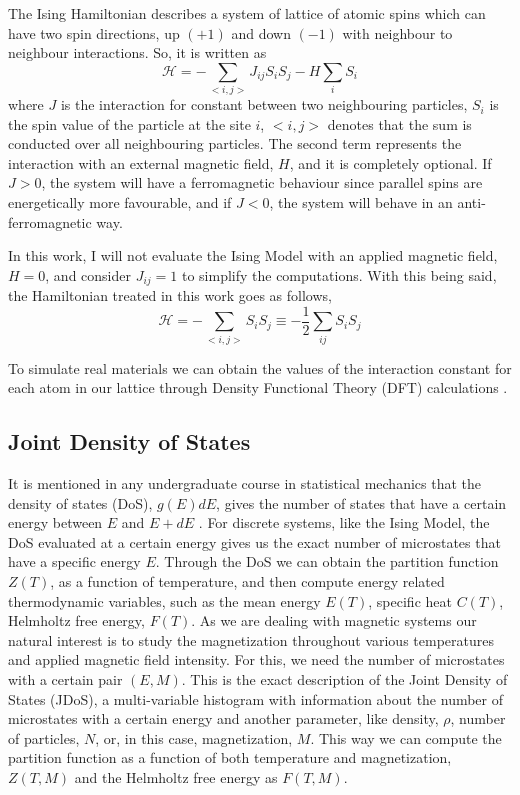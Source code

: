 The Ising Hamiltonian describes a system of lattice of atomic spins which can have two spin directions, up $(+1)$ and down $(-1)$ with neighbour to neighbour interactions. So, it is written as
\begin{equation}
	\mathcal{H} = -\sum_{<i,j>} J_{ij} S_i S_j - H \sum_iS_i
\end{equation}
where $J$ is the interaction for constant between two neighbouring particles, $S_i$ is the spin value of the particle at the site $i$, $<i,j>$ denotes that the sum is conducted over all neighbouring particles. The second term represents the interaction with an external magnetic field, $H$, and it is completely optional. If $J>0$, the system will have a ferromagnetic behaviour since parallel spins are energetically more favourable, and if $J<0$, the system will behave in an anti-ferromagnetic way.

In this work, I will not evaluate the Ising Model with an applied magnetic field, $H=0$, and consider $J_{ij}=1$ to simplify the computations. With this being said, the Hamiltonian treated in this work goes as follows,
\begin{equation}
	\mathcal{H} = -\sum_{<i,j>} S_i  S_j \equiv -\frac{1}{2} \sum_{ij} S_i S_j
\end{equation}

To simulate real materials we can obtain the values of the interaction constant for each atom in our lattice through Density Functional Theory (DFT) calculations \cite{DFT_book, Marzari2021}.

\subsection{Joint Density of States}

It is mentioned in any undergraduate course in statistical mechanics that the density of states (DoS), $g(E)dE$, gives the number of states that have a certain energy between $E$ and $E+dE$ \cite{stat_mech}. For discrete systems, like the Ising Model, the DoS evaluated at a certain energy gives us the exact number of microstates that have a specific energy $E$. Through the DoS we can obtain the partition function $Z(T)$, as a function of temperature, and then compute energy related thermodynamic variables, such as the mean energy $E(T)$, specific heat $C(T)$, Helmholtz free energy, $F(T)$.  
As we are dealing with magnetic systems our natural interest is to study the magnetization throughout various temperatures and applied magnetic field intensity. For this, we need the number of microstates with a certain pair $(E,M)$. This is the exact description of the Joint Density of States (JDoS), a multi-variable histogram with information about the number of microstates with a certain energy and another parameter, like density, $\rho$, number of particles, $N$, or, in this case, magnetization, $M$. This way we can compute the partition function as a function of both temperature and magnetization, $Z(T,M)$ and the Helmholtz free energy as $F(T,M)$.

